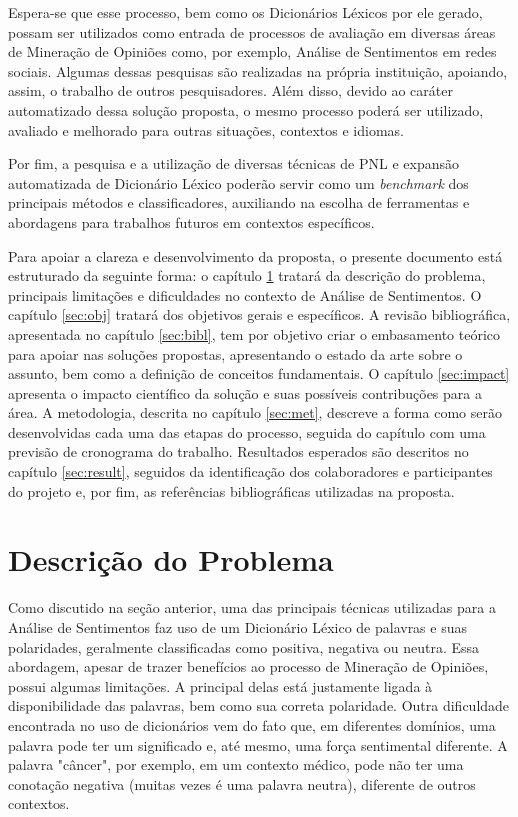 \documentclass[a4paper,11pt]{article}
\begin{document}
Espera-se que esse processo, bem como os Dicionários Léxicos por ele gerado, possam ser utilizados como entrada de processos de avaliação em diversas áreas de Mineração de Opiniões como, por exemplo, Análise de Sentimentos em redes sociais. Algumas dessas pesquisas são realizadas na própria instituição, apoiando, assim, o trabalho de outros pesquisadores. Além disso, devido ao caráter automatizado dessa solução proposta, o mesmo processo poderá ser utilizado, avaliado e melhorado para outras situações, contextos e idiomas.

Por fim, a pesquisa e a utilização de diversas técnicas de PNL e expansão automatizada de Dicionário Léxico poderão servir como um \emph{benchmark} dos principais métodos e classificadores, auxiliando na escolha de ferramentas e abordagens para trabalhos futuros em contextos específicos.

Para apoiar a clareza e desenvolvimento da proposta, o presente documento está estruturado da seguinte forma: o capítulo \ref{sec:desc} tratará da descrição do problema, principais limitações e dificuldades no contexto de Análise de Sentimentos. O capítulo \ref{sec:obj} tratará dos objetivos gerais e específicos. A revisão bibliográfica, apresentada no capítulo \ref{sec:bibl}, tem por objetivo criar o embasamento teórico para apoiar nas soluções propostas, apresentando o estado da arte sobre o assunto, bem como a definição de conceitos fundamentais. O capítulo \ref{sec:impact} apresenta o impacto científico da solução e suas possíveis contribuções para a área. A metodologia, descrita no capítulo \ref{sec:met}, descreve a forma como serão desenvolvidas cada uma das etapas do processo, seguida do capítulo com uma previsão de cronograma do trabalho. Resultados esperados são descritos no capítulo \ref{sec:result}, seguidos da identificação dos colaboradores e participantes do projeto e, por fim, as referências bibliográficas utilizadas na proposta.


\section{Descrição do Problema}
\label{sec:desc}
Como discutido na seção anterior, uma das principais técnicas utilizadas para a Análise de Sentimentos faz uso de um Dicionário Léxico de palavras e suas polaridades, geralmente classificadas como positiva, negativa ou neutra. Essa abordagem, apesar de trazer benefícios ao processo de Mineração de Opiniões, possui algumas limitações. A principal delas está justamente ligada à disponibilidade das palavras, bem como sua correta polaridade. Outra dificuldade encontrada no uso de dicionários vem do fato que, em diferentes domínios, uma palavra pode ter um significado e, até mesmo, uma força sentimental diferente. A palavra "câncer", por exemplo, em um contexto médico, pode não ter uma conotação negativa (muitas vezes é uma palavra neutra), diferente de outros contextos.
\end{document}
